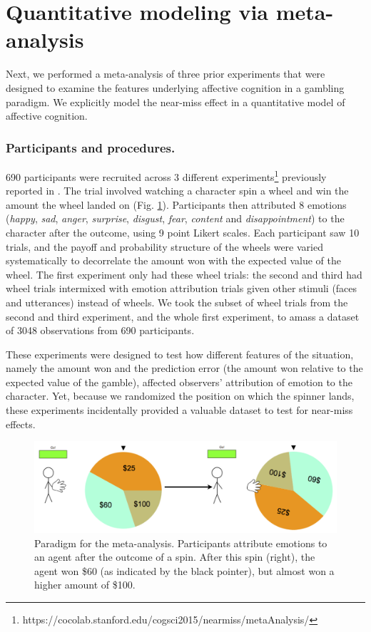 \documentclass[10pt,letterpaper]{article}
\begin{document}



\section{Quantitative modeling via meta-analysis}
	Next, we performed a meta-analysis of three prior experiments that were designed to examine the features underlying affective cognition in a gambling paradigm. We explicitly model the near-miss effect in a quantitative model of affective cognition.
	
\subsubsection{Participants and procedures.}
	690 participants were recruited across 3 different experiments\footnote{https://cocolab.stanford.edu/cogsci2015/nearmiss/metaAnalysis/} previously reported in . The trial involved watching a character spin a wheel and win the amount the wheel landed on (Fig. \ref{Expt3ParadigmFig}). Participants then attributed 8 emotions (\textit{happy}, \textit{sad}, \textit{anger}, \textit{surprise}, \textit{disgust}, \textit{fear}, \textit{content} and \textit{disappointment}) to the character after the outcome, using 9 point Likert scales. Each participant saw 10 trials, and the payoff and probability structure of the wheels were varied systematically to decorrelate the amount won with the expected value of the wheel. The first experiment only had these wheel trials: the second and third had wheel trials intermixed with emotion attribution trials given other stimuli (faces and utterances) instead of wheels. We took the subset of wheel trials from the second and third experiment, and the whole first experiment, to amass a dataset of 3048 observations from 690 participants.
	
	These experiments were designed to test how different features of the situation, namely the amount won and the prediction error (the amount won relative to the expected value of the gamble), affected observers' attribution of emotion to the character. Yet, because we randomized the position on which the spinner lands, these experiments incidentally provided a valuable dataset to test for near-miss effects.

\begin{figure}[htb!]
\includegraphics[width=\columnwidth]{images/expt3Paradigm.png}
\caption{ Paradigm for the meta-analysis. Participants attribute emotions to an agent after the outcome of a spin. After this spin (right), the agent won \$60 (as indicated by the black pointer), but almost won a higher amount of \$100. }
\label{Expt3ParadigmFig}
\end{figure}
\end{document}
